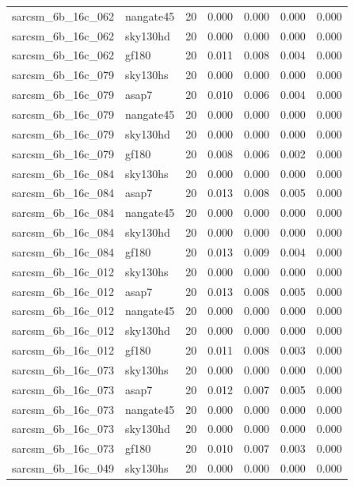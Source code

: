 \begin{tabular}{llrrrrr}
sarcsm\_6b\_16c\_062 & nangate45 & 20 & 0.000 & 0.000 & 0.000 & 0.000 \\
sarcsm\_6b\_16c\_062 & sky130hd & 20 & 0.000 & 0.000 & 0.000 & 0.000 \\
sarcsm\_6b\_16c\_062 & gf180 & 20 & 0.011 & 0.008 & 0.004 & 0.000 \\
sarcsm\_6b\_16c\_079 & sky130hs & 20 & 0.000 & 0.000 & 0.000 & 0.000 \\
sarcsm\_6b\_16c\_079 & asap7 & 20 & 0.010 & 0.006 & 0.004 & 0.000 \\
sarcsm\_6b\_16c\_079 & nangate45 & 20 & 0.000 & 0.000 & 0.000 & 0.000 \\
sarcsm\_6b\_16c\_079 & sky130hd & 20 & 0.000 & 0.000 & 0.000 & 0.000 \\
sarcsm\_6b\_16c\_079 & gf180 & 20 & 0.008 & 0.006 & 0.002 & 0.000 \\
sarcsm\_6b\_16c\_084 & sky130hs & 20 & 0.000 & 0.000 & 0.000 & 0.000 \\
sarcsm\_6b\_16c\_084 & asap7 & 20 & 0.013 & 0.008 & 0.005 & 0.000 \\
sarcsm\_6b\_16c\_084 & nangate45 & 20 & 0.000 & 0.000 & 0.000 & 0.000 \\
sarcsm\_6b\_16c\_084 & sky130hd & 20 & 0.000 & 0.000 & 0.000 & 0.000 \\
sarcsm\_6b\_16c\_084 & gf180 & 20 & 0.013 & 0.009 & 0.004 & 0.000 \\
sarcsm\_6b\_16c\_012 & sky130hs & 20 & 0.000 & 0.000 & 0.000 & 0.000 \\
sarcsm\_6b\_16c\_012 & asap7 & 20 & 0.013 & 0.008 & 0.005 & 0.000 \\
sarcsm\_6b\_16c\_012 & nangate45 & 20 & 0.000 & 0.000 & 0.000 & 0.000 \\
sarcsm\_6b\_16c\_012 & sky130hd & 20 & 0.000 & 0.000 & 0.000 & 0.000 \\
sarcsm\_6b\_16c\_012 & gf180 & 20 & 0.011 & 0.008 & 0.003 & 0.000 \\
sarcsm\_6b\_16c\_073 & sky130hs & 20 & 0.000 & 0.000 & 0.000 & 0.000 \\
sarcsm\_6b\_16c\_073 & asap7 & 20 & 0.012 & 0.007 & 0.005 & 0.000 \\
sarcsm\_6b\_16c\_073 & nangate45 & 20 & 0.000 & 0.000 & 0.000 & 0.000 \\
sarcsm\_6b\_16c\_073 & sky130hd & 20 & 0.000 & 0.000 & 0.000 & 0.000 \\
sarcsm\_6b\_16c\_073 & gf180 & 20 & 0.010 & 0.007 & 0.003 & 0.000 \\
sarcsm\_6b\_16c\_049 & sky130hs & 20 & 0.000 & 0.000 & 0.000 & 0.000 \\

\end{tabular}
